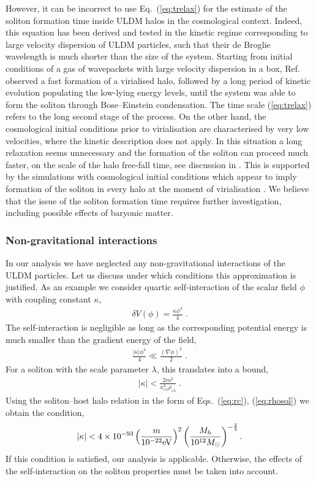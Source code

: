 \documentclass[aps,prd,floats,superscriptaddress,showpacs,nofootinbib,twocolumn,preprintnumbers]{revtex4-1}%
\def\be{\begin{eqnarray}}
\def\ee{\end{eqnarray}}
\begin{document}
However, it can be incorrect to use Eq.~(\ref{eq:trelax})
for the estimate of the soliton formation 
time inside ULDM halos in the cosmological
context. Indeed, this equation has been derived and tested in the
kinetic regime corresponding to large velocity 
dispersion of ULDM particles, such 
that their de Broglie wavelength is much
shorter than the size of the system. 
Starting from initial conditions of a gas of wavepackets with large
velocity dispersion in a box, 
Ref.~\cite{Levkov:2018kau}
observed a fast formation of a virialised halo, followed by 
a long period of kinetic evolution populating the low-lying
energy levels, until the system was able to form the soliton through
Bose--Einstein condensation. The time scale 
(\ref{eq:trelax}) refers to the long second stage of the process.
On the other hand, the cosmological initial conditions
prior to virialisation are characterised by very low velocities, 
where the kinetic description
does not apply. In this situation a long relaxation seems unnecessary and
the formation of the soliton can
proceed much faster, on the scale of the halo free-fall time, see
discussion in \cite{Levkov:2018kau}.
This is supported by the simulations with cosmological
initial conditions which appear to imply formation of the soliton in every halo
at the moment of virialisation
\cite{Schive:2014dra,Veltmaat:2018dfz}. We believe that the issue of
the soliton formation time requires further investigation, including 
possible effects of baryonic matter.


\subsubsection{Non-gravitational interactions}

In our analysis we have neglected any non-gravitational
interactions of the ULDM particles. Let us discuss under which
conditions this approximation is justified. As an example we consider
quartic self-interaction of the scalar field $\phi$ with coupling
constant $\kappa$,
\be
\label{eq:selfint}
\delta V(\phi)=\frac{\kappa\phi^4}{4}\;.
\ee
The self-interaction is negligible as long as the corresponding 
potential energy is much smaller than the 
gradient energy of the field,
\be
\frac{|\kappa|\phi^4}{4}\ll\frac{(\nabla\phi)^2}{2}\;.
\ee 
For a soliton with the scale parameter $\lambda$, this translates into a bound,
\be
|\kappa|<\frac{2m^2}{x_{c\lambda}^2\rho_{c\lambda}}\;.
\ee
Using the soliton--host halo relation in the form of Eqs.~(\ref{eq:rc}),
(\ref{eq:rhosol}) we obtain the condition,
\be
\label{eq:kappabound}
|\kappa|<4\times 10^{-93}\left(\frac{m}{10^{-22}{\rm eV}}\right)^2
\left(\frac{M_h}{10^{12}M_\odot}\right)^{-\frac{2}{3}}.
\ee 
If this condition is satisfied, our analysis is applicable. Otherwise,
the effects of the self-interaction on the soliton properties must be
taken into account.
\end{document}
